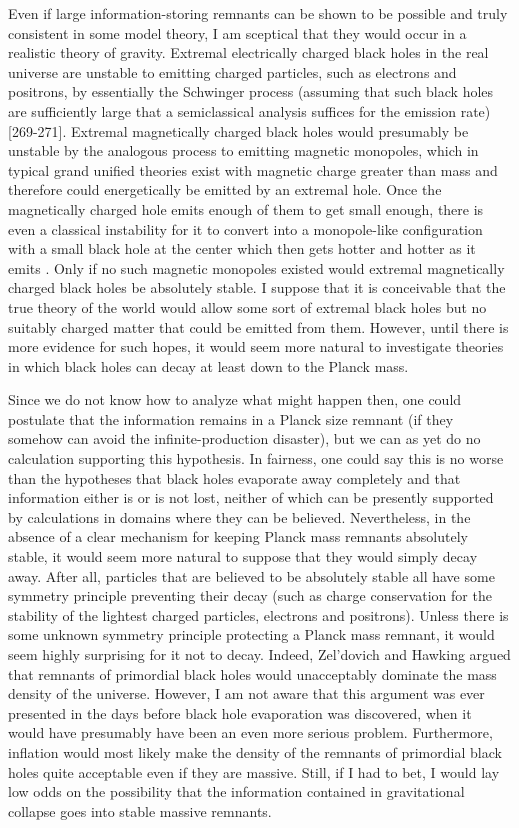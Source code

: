 \documentclass[12pt]{article}
\begin{document}
     Even if large information-storing remnants can be shown to be
possible and
truly consistent in some model theory, I am sceptical that they would
occur in
a realistic theory of gravity.  Extremal electrically charged black
holes in
the real universe are unstable to emitting charged particles, such as
electrons
and positrons, by essentially the Schwinger process \cite{Sch51}
(assuming
that
such black holes are sufficiently large that a semiclassical analysis
suffices
for the emission rate) [269-271].  Extremal magnetically
charged
black holes would presumably be unstable by the analogous process
\cite{Aff81}
to emitting magnetic monopoles, which in typical grand unified
theories exist
with magnetic charge greater than mass and therefore could
energetically be
emitted by an extremal hole.  Once the magnetically charged hole
emits enough
of them to get small enough, there is even a classical instability
for it to
convert into a monopole-like configuration with a small black hole at
the
center which then gets hotter and hotter as it emits
\cite{LNW1,LNW2}. Only
if
no such magnetic monopoles existed would extremal magnetically
charged black
holes be absolutely stable.  I suppose that it is conceivable that
the true
theory of the world would allow some sort of extremal black holes but
no
suitably charged matter that could be emitted from them.  However,
until there
is more evidence for such hopes, it would seem more natural to
investigate theories in which black holes can decay at least down to
the Planck
mass.

     Since we do not know how to analyze what might happen then, one
could
postulate that the information remains in a Planck size remnant (if
they
somehow can avoid the infinite-production disaster), but we can as
yet do no
calculation supporting this hypothesis.  In fairness, one could say
this is no
worse than the hypotheses that black holes evaporate away completely
and that
information either is or is not lost, neither of which can be
presently
supported by calculations in domains where they can be believed.
Nevertheless,
in the absence of a clear mechanism for keeping Planck mass remnants
absolutely
stable, it would seem more natural to suppose that they would simply
decay
away.  After all, particles that are believed
to be absolutely stable all have some symmetry principle preventing
their decay
(such as charge conservation for the stability of the lightest
charged
particles, electrons and positrons).  Unless there is some unknown
symmetry
principle protecting a Planck mass remnant, it would seem highly
surprising for
it not to decay.  Indeed, Zel'dovich \cite{Zel77a} and Hawking
\cite{Haw82}
argued that remnants of primordial black holes would unacceptably
dominate
the mass density of the universe. However, I am not aware that this
argument
was ever presented in the days before black hole evaporation was
discovered,
when it would have presumably have been an even more serious problem.
Furthermore, inflation would most likely make the density of the
remnants
of primordial black holes quite acceptable even if they are massive.
Still, if I had to bet, I would lay low odds on the possibility that
the
information
contained in gravitational collapse goes into stable massive
remnants.
\end{document}
